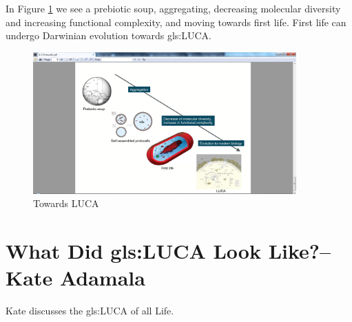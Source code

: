 \documentclass[]{article}
\begin{document}
In Figure \ref{fig:TowardsLUCA} we see a prebiotic soup, aggregating, decreasing molecular diversity and increasing functional complexity, and moving towards first life. First life can undergo Darwinian evolution towards \gls{gls:LUCA}.
\begin{figure}[H]
	\caption{Towards LUCA}\label{fig:TowardsLUCA}
	\includegraphics[width=0.9\textwidth]{TowardsLUCA}
\end{figure}

\section[What Did LUCA Look Like?]{What Did \gls{gls:LUCA} Look Like?--Kate Adamala}

Kate discusses the \glsdesc{gls:LUCA} of all Life.
\end{document}
